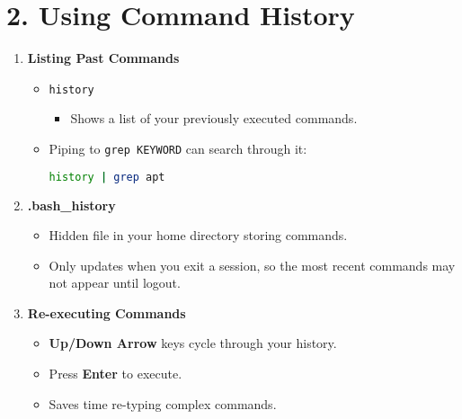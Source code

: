 \documentclass[a4paper]{report}
\begin{document}
\section*{2. Using Command History}
\begin{enumerate}
    \item \textbf{Listing Past Commands}
    \begin{itemize}
        \item \texttt{history}
        \begin{itemize}
            \item Shows a list of your previously executed commands.
        \end{itemize}
        \item Piping to \texttt{grep KEYWORD} can search through it:
        \begin{lstlisting}[language=bash]
history | grep apt
        \end{lstlisting}
    \end{itemize}

    \item \textbf{.bash\_history}
    \begin{itemize}
        \item Hidden file in your home directory storing commands.
        \item Only updates when you exit a session, so the most recent commands may not appear until logout.
    \end{itemize}

    \item \textbf{Re-executing Commands}
    \begin{itemize}
        \item \textbf{Up/Down Arrow} keys cycle through your history.
        \item Press \textbf{Enter} to execute.
        \item Saves time re-typing complex commands.
    \end{itemize}
\end{enumerate}
\end{document}

